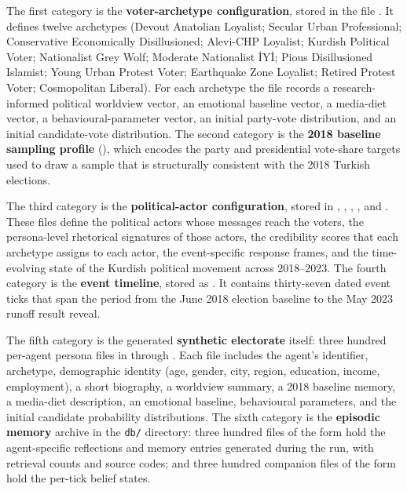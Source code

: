 \documentclass[12pt,a4paper]{report}
\begin{document}
The first category is the \textbf{voter-archetype configuration}, stored in the file . It defines twelve archetypes (Devout Anatolian Loyalist; Secular Urban Professional; Conservative Economically Disillusioned; Alevi-CHP Loyalist; Kurdish Political Voter; Nationalist Grey Wolf; Moderate Nationalist İYİ; Pious Disillusioned Islamist; Young Urban Protest Voter; Earthquake Zone Loyalist; Retired Protest Voter; Cosmopolitan Liberal). For each archetype the file records a research-informed political worldview vector, an emotional baseline vector, a media-diet vector, a behavioural-parameter vector, an initial party-vote distribution, and an initial candidate-vote distribution. The second category is the \textbf{2018 baseline sampling profile} (), which encodes the party and presidential vote-share targets used to draw a sample that is structurally consistent with the 2018 Turkish elections.

The third category is the \textbf{political-actor configuration}, stored in , , , , and . These files define the political actors whose messages reach the voters, the persona-level rhetorical signatures of those actors, the credibility scores that each archetype assigns to each actor, the event-specific response frames, and the time-evolving state of the Kurdish political movement across 2018--2023. The fourth category is the \textbf{event timeline}, stored as . It contains thirty-seven dated event ticks that span the period from the June 2018 election baseline to the May 2023 runoff result reveal.

The fifth category is the generated \textbf{synthetic electorate} itself: three hundred per-agent persona files in  through . Each file includes the agent's identifier, archetype, demographic identity (age, gender, city, region, education, income, employment), a short biography, a worldview summary, a 2018 baseline memory, a media-diet description, an emotional baseline, behavioural parameters, and the initial candidate probability distributions. The sixth category is the \textbf{episodic memory} archive in the \texttt{db/} directory: three hundred files of the form  hold the agent-specific reflections and memory entries generated during the run, with retrieval counts and source codes; and three hundred companion files of the form  hold the per-tick belief states.
\end{document}
